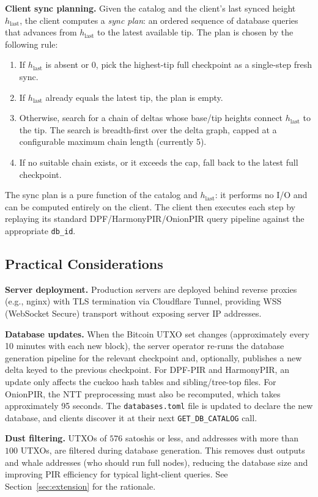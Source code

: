 \textbf{Client sync planning.} Given the catalog and the client's last synced height $h_\text{last}$, the client computes a \emph{sync plan}: an ordered sequence of database queries that advances from $h_\text{last}$ to the latest available tip. The plan is chosen by the following rule:
\begin{enumerate}[nolistsep,leftmargin=*]
    \item If $h_\text{last}$ is absent or $0$, pick the highest-tip full checkpoint as a single-step fresh sync.
    \item If $h_\text{last}$ already equals the latest tip, the plan is empty.
    \item Otherwise, search for a chain of deltas whose base/tip heights connect $h_\text{last}$ to the tip. The search is breadth-first over the delta graph, capped at a configurable maximum chain length (currently 5).
    \item If no suitable chain exists, or it exceeds the cap, fall back to the latest full checkpoint.
\end{enumerate}
The sync plan is a pure function of the catalog and $h_\text{last}$: it performs no I/O and can be computed entirely on the client. The client then executes each step by replaying its standard DPF/HarmonyPIR/OnionPIR query pipeline against the appropriate \texttt{db\_id}.

\subsection{Practical Considerations}

\textbf{Server deployment.} Production servers are deployed behind reverse proxies (e.g., nginx) with TLS termination via Cloudflare Tunnel, providing WSS (WebSocket Secure) transport without exposing server IP addresses.

\textbf{Database updates.} When the Bitcoin UTXO set changes (approximately every 10 minutes with each new block), the server operator re-runs the database generation pipeline for the relevant checkpoint and, optionally, publishes a new delta keyed to the previous checkpoint. For DPF-PIR and HarmonyPIR, an update only affects the cuckoo hash tables and sibling/tree-top files. For OnionPIR, the NTT preprocessing must also be recomputed, which takes approximately 95 seconds. The \texttt{databases.toml} file is updated to declare the new database, and clients discover it at their next \texttt{GET\_DB\_CATALOG} call.

\textbf{Dust filtering.} UTXOs of $576$ satoshis or less, and addresses with more than $100$ UTXOs, are filtered during database generation. This removes dust outputs and whale addresses (who should run full nodes), reducing the database size and improving PIR efficiency for typical light-client queries. See Section~\ref{sec:extension} for the rationale.
